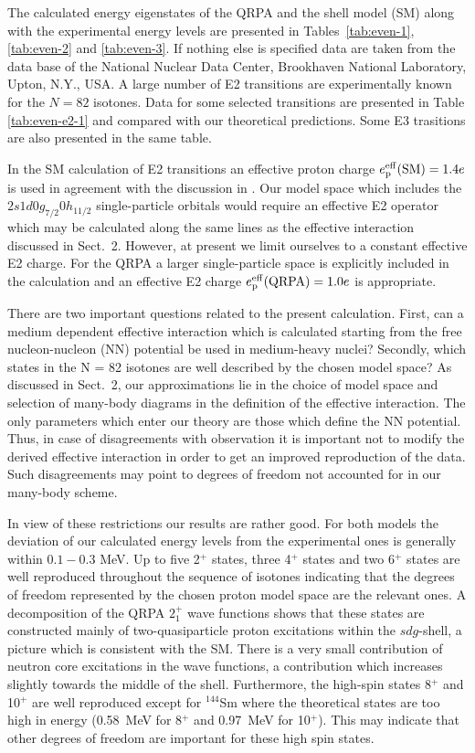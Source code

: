 The calculated energy eigenstates of the QRPA and the shell model (SM) along
with the experimental energy levels are presented in Tables\ \ref{tab:even-1}, 
\ref{tab:even-2} and \ref{tab:even-3}. If nothing else is specified data 
are taken from the data base of the National Nuclear Data Center, Brookhaven
National Laboratory, Upton, N.Y., USA.
A large number of E2 transitions are experimentally
known for the $N = 82$ isotones. Data for some selected transitions are 
presented in Table \ref{tab:even-e2-1} and compared with our theoretical 
predictions. Some E3 trasitions are also presented in the same table.

In the SM calculation of E2 transitions an effective proton charge 
$e_{\rm p}^{\rm eff}({\rm SM}) = 1.4e$ is used in 
agreement with the discussion in \cite{boh63}. 
Our model space which includes the 
$2s1d0g_{7/2}0h_{11/2}$ single-particle orbitals
would require an 
effective E2 operator which may be calculated along the same lines
as the effective interaction discussed 
in Sect.~2. However, at present we
limit ourselves to a constant effective E2 charge. For the QRPA 
a larger single-particle space is explicitly included in the  calculation
and an  effective E2 charge $e_{\rm p}^{\rm eff}({\rm QRPA}) = 1.0e$ 
is appropriate.

There are two important questions related to the present calculation.
First, can a medium dependent
effective interaction which  is calculated starting
from the free nucleon-nucleon (NN)
potential
be used in medium-heavy nuclei? Secondly, which states in the N = 82
isotones are well described by the chosen model space?
As discussed in Sect.\ 2, our approximations lie in the choice of
model space and selection of many-body diagrams in
the definition of the effective interaction.
The only parameters which enter our theory are those 
which define the NN potential. 
Thus, in case of disagreements with observation it is important
not to modify the derived effective interaction
in order to get an improved reproduction of the data. 
Such disagreements may point to degrees of freedom not accounted for 
in our many-body scheme.  


In view of these restrictions our results are rather good.
For both models the deviation of our calculated 
energy levels from the experimental ones is generally within $0.1 - 0.3$ 
MeV. Up to five 2$^+$ states, three 4$^+$ states and two 6$^+$ states
are well reproduced throughout the sequence of isotones
indicating that the degrees of freedom represented by the chosen proton 
model space are the relevant ones.   
A decomposition of the QRPA $2^{+}_{1}$ wave functions shows
that these states are constructed mainly of two-quasiparticle proton
excitations within the $sdg$-shell, a picture which is consistent with the SM. 
There is a very  small contribution of neutron core excitations in the 
wave functions, a contribution 
which increases slightly towards the middle of the shell.
Furthermore,  
the high-spin states 8$^+$ and 10$^+$ are well reproduced
except for  $^{144}$Sm where the theoretical states 
are too high in energy (0.58~MeV for 8$^{+}$ and 0.97~MeV for 10$^{+}$).
This may indicate that other degrees of freedom are important for these 
high spin states. 

